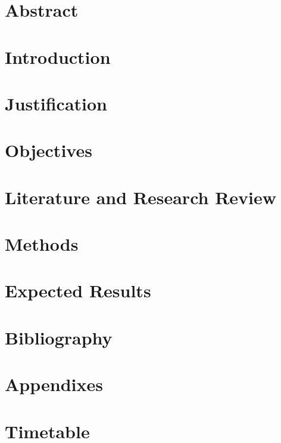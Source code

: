 \documentclass[10pt]{article}
\begin{document}
\section{Abstract}

\section{Introduction}

\section{Justification}

\section{Objectives}

\section{Literature and Research Review}

\section{Methods}

\section{Expected Results}

\section{Bibliography}

\section{Appendixes}

\section{Timetable}
  
\end{document}
